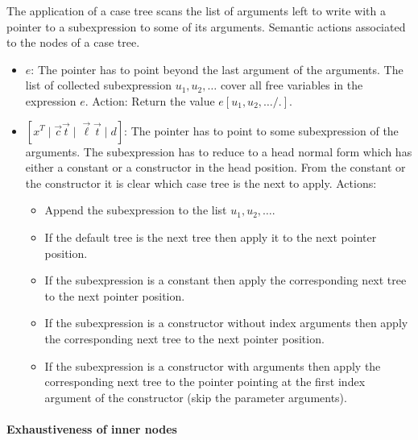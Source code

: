 The application of a case tree scans the list of arguments left to write with a
pointer to a subexpression to some of its arguments. Semantic actions associated
to the nodes of a case tree.
\begin{itemize}
    \item $e$: The pointer has to point beyond the last argument of the
        arguments. The list of collected subexpression $u_1, u_2, \ldots$ cover
        all free variables in the expression $e$. Action: Return the value
        $e[u_1,u_2,\ldots / .]$.

    \item $[x^T \mid \vec c \vec t \mid \vec \ell \vec t \mid d]$:
        The pointer has to point to some subexpression of the arguments. The
        subexpression has to reduce to a head normal form which has either a
        constant or a constructor in the head position. From the constant or the
        constructor it is clear which case tree is the next to apply.
        Actions:
        \begin{itemize}
            \item Append the subexpression to the list $u_1,u_2,\ldots$.

            \item If the default tree is the next tree then apply it to the next
                pointer position.

            \item If the subexpression is a constant then apply the
                corresponding next tree to the next pointer position.

            \item If the subexpression is a constructor without index
                arguments then apply the corresponding next tree to the next
                pointer position.

            \item If the subexpression is a constructor with arguments then
                apply the corresponding next tree to the pointer pointing at the
                first index argument of the constructor (skip the parameter
                arguments).
        \end{itemize}
\end{itemize}



\paragraph{Exhaustiveness of inner nodes}
%

